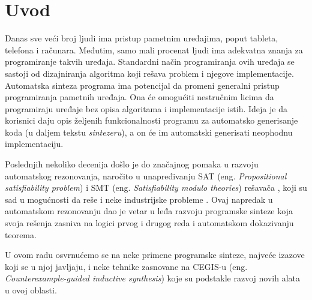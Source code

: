 \section{Uvod}
\label{sec:uvod}

Danas sve veći broj ljudi ima pristup pametnim uređajima, poput tableta, telefona i računara. Međutim, samo mali procenat ljudi ima adekvatna znanja za programiranje takvih uređaja. Standardni način programiranja ovih uređaja se sastoji od dizajniranja algoritma koji rešava problem i njegove implementacije. Automatska sinteza programa ima potencijal da promeni generalni pristup programiranja pametnih uređaja. Ona će omogućiti nestručnim licima da programiraju uređaje bez opisa algoritama i implementacije istih. Ideja je da korisnici daju opis željenih funkcionalnosti programu za automatsko generisanje koda (u daljem tekstu \emph{sintezeru}), a on će im automatski generisati neophodnu implementaciju.

Poslednjih nekoliko decenija došlo je do značajnog pomaka u razvoju automatskog rezonovanja, naročito u unapređivanju SAT (eng. \emph{Propositional satisfiability problem}) i SMT (eng. \emph{Satisfiability modulo theories}) rešavača \cite{SMT}, koji su sad u mogućnosti da reše i neke industrijske probleme \cite{PSE}. Ovaj napredak u automatskom rezonovanju dao je vetar u leđa razvoju programske sinteze koja svoja rešenja zasniva na logici prvog i drugog reda i automatskom dokazivanju teorema.

U ovom radu osvrnućemo se na neke primene programske sinteze, najveće izazove koji se u njoj javljaju, i neke tehnike zasnovane na CEGIS-u (eng. \emph{Counterexample-guided inductive synthesis}) koje su podstakle razvoj novih alata u ovoj oblasti.
